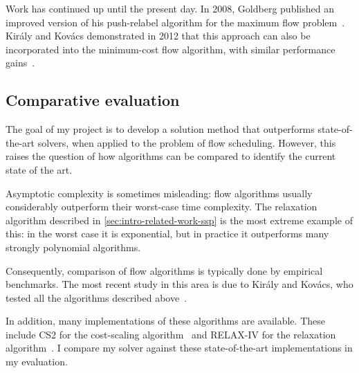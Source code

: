 Work has continued up until the present day. In 2008, Goldberg published an improved version of his push-relabel algorithm for the maximum flow problem~\cite{Goldberg:2008}. Kir{\'{a}}ly and Kov{\'{a}}cs demonstrated in 2012 that this approach can also be incorporated into the minimum-cost flow algorithm, with similar performance gains~\cite{KiralyKovacs:2012}.

\subsection{Comparative evaluation}

The goal of my project is to develop a solution method that outperforms state-of-the-art solvers, when applied to the problem of flow scheduling. However, this raises the question of how algorithms can be compared to identify the current state of the art.

Asymptotic complexity is sometimes misleading: flow algorithms usually considerably outperform their worst-case time complexity. The relaxation algorithm described in \cref{sec:intro-related-work-ssp} is the most extreme example of this: in the worst case it is exponential, but in practice it outperforms many strongly polynomial algorithms.

Consequently, comparison of flow algorithms is typically done by empirical benchmarks. The most recent study in this area is due to Kir{\'{a}}ly and Kov{\'{a}}cs, who tested all the algorithms described above~\cite{KiralyKovacs:2012,Kovacs:2015}.

In addition, many implementations of these algorithms are available. These include CS2 for the cost-scaling algorithm~\cite{CS2:2009} and RELAX-IV for the relaxation algorithm~\cite{RelaxIV:2011}. I compare my solver against these state-of-the-art implementations in my evaluation.